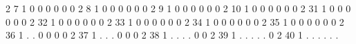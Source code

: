   {\VBAR}  2    7   1         0         0         0         0         0         0 {\VBAR}
  {\VBAR}  2    8   1         0         0         0         0         0         0 {\VBAR}
  {\VBAR}  2    9   1         0         0         0         0         0         0 {\VBAR}
  {\VBAR}  2   10   1         0         0         0         0         0         0 {\VBAR}
  {\LFTT}
  {\VBAR}  2   31   1         0         0         0         0         0         0 {\VBAR}
  {\VBAR}  2   32   1         0         0         0         0         0         0 {\VBAR}
  {\VBAR}  2   33   1         0         0         0         0         0         0 {\VBAR}
  {\VBAR}  2   34   1         0         0         0         0         0         0 {\VBAR}
  {\VBAR}  2   35   1         0         0         0         0         0         0 {\VBAR}
  {\VBAR}  2   36   1         .         .         0         0         0         0 {\VBAR}
  {\VBAR}  2   37   1         .         .         .         0         0         0 {\VBAR}
  {\VBAR}  2   38   1         .         .         .         .         0         0 {\VBAR}
  {\VBAR}  2   39   1         .         .         .         .         .         0 {\VBAR}
  {\VBAR}  2   40   1         .         .         .         .         .         . {\VBAR}
  {\BLC}
